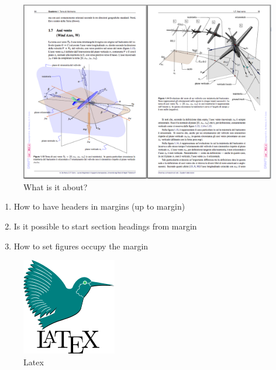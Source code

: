 \documentclass[a4paper]{article}
\begin{document}
\begin{figure}
  \includegraphics[width=\linewidth]{images/8IOMm.png} %
  \caption{What is it about?}
  \label{fig:airplane}
\end{figure}
\begin{enumerate}
 \item How to have headers in margins (up to margin)
 \item Is it possible to start section headings from margin
 \item How to set figures occupy the margin
\end{enumerate}

\begin{figure}
  \includegraphics[width=\linewidth]{images/latex.png}
  \caption{Latex}
  \label{fig:latex}
\end{figure}
\end{document}
